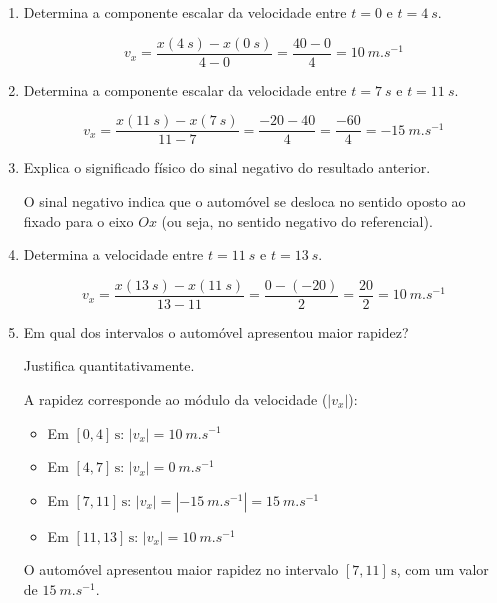\documentclass[11pt,a4paper]{article}
\begin{document}
\begin{enumerate}[label=\textbf{\arabic*.}]
		\item Determina a componente escalar da velocidade entre
		$t=0$ e $t=\SI{4}{s}$.
		
		\begin{solucao}
			\[
			v_x = \frac{x(\SI{4}{s}) - x(\SI{0}{s})}{4 - 0} = \frac{40 - 0}{4} = \SI{10}{m.s^{-1}}
			\]
		\end{solucao}
		
		\item Determina a componente escalar da velocidade entre
		$t=\SI{7}{s}$ e $t=\SI{11}{s}$.
		
		\begin{solucao}
			\[
			v_x = \frac{x(\SI{11}{s}) - x(\SI{7}{s})}{11 - 7} = \frac{-20 - 40}{4} = \frac{-60}{4} = \SI{-15}{m.s^{-1}}
			\]
		\end{solucao}
		
		\item Explica o significado físico do sinal negativo do resultado anterior.
		
		\begin{solucao}
			O sinal negativo indica que o automóvel se desloca no sentido oposto ao fixado para o eixo $Ox$ (ou seja, no sentido negativo do referencial).
		\end{solucao}
		
		\item Determina a velocidade entre $t=\SI{11}{s}$ e $t=\SI{13}{s}$.
		
		\begin{solucao}
			\[
			v_x = \frac{x(\SI{13}{s}) - x(\SI{11}{s})}{13 - 11} = \frac{0 - (-20)}{2} = \frac{20}{2} = \SI{10}{m.s^{-1}}
			\]
		\end{solucao}
		
		\item Em qual dos intervalos o automóvel apresentou maior rapidez?
		
		Justifica quantitativamente.
		
		\begin{solucao}
			A rapidez corresponde ao módulo da velocidade ($|v_x|$):
			\begin{itemize}
				\item Em $[0, 4]\,\text{s}$: $|v_x| = \SI{10}{m.s^{-1}}$
				\item Em $[4, 7]\,\text{s}$: $|v_x| = \SI{0}{m.s^{-1}}$
				\item Em $[7, 11]\,\text{s}$: $|v_x| = |\SI{-15}{m.s^{-1}}| = \SI{15}{m.s^{-1}}$
				\item Em $[11, 13]\,\text{s}$: $|v_x| = \SI{10}{m.s^{-1}}$
			\end{itemize}
			O automóvel apresentou maior rapidez no intervalo $[7, 11]\,\text{s}$, com um valor de $\SI{15}{m.s^{-1}}$.
		\end{solucao}
		

\end{enumerate}
\end{document}

